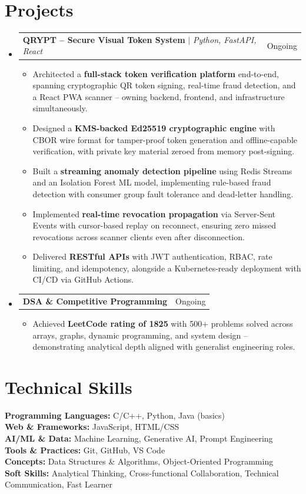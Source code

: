 \documentclass[letterpaper,11pt]{article}
\makeatletter
\newcommand{\resumeItem}[1]{
  \item\small{
    {#1 \vspace{-2pt}}
  }
}
\newcommand{\resumeProjectHeading}[2]{
    \item
    \begin{tabular*}{0.97\textwidth}{l@{\extracolsep{\fill}}r}
      \small#1 & #2 \\
    \end{tabular*}\vspace{-7pt}
}
\newcommand{\resumeSubHeadingListStart}{\begin{itemize}[leftmargin=0.15in, label={}]}
\newcommand{\resumeSubHeadingListEnd}{\end{itemize}}
\newcommand{\resumeItemListStart}{\begin{itemize}}
\newcommand{\resumeItemListEnd}{\end{itemize}\vspace{-5pt}}
\makeatother
\begin{document}
\section{Projects}
  \resumeSubHeadingListStart

    \resumeProjectHeading
      {\textbf{QRYPT -- Secure Visual Token System} $|$ \emph{Python, FastAPI, React} \quad {\scriptsize \textit{(Vibe Coded)}}}{Ongoing}
      \resumeItemListStart
        \resumeItem{Architected a \textbf{full-stack token verification platform} end-to-end, spanning cryptographic QR token signing, real-time fraud detection, and a React PWA scanner -- owning backend, frontend, and infrastructure simultaneously.}
        \resumeItem{Designed a \textbf{KMS-backed Ed25519 cryptographic engine} with CBOR wire format for tamper-proof token generation and offline-capable verification, with private key material zeroed from memory post-signing.}
        \resumeItem{Built a \textbf{streaming anomaly detection pipeline} using Redis Streams and an Isolation Forest ML model, implementing rule-based fraud detection with consumer group fault tolerance and dead-letter handling.}
        \resumeItem{Implemented \textbf{real-time revocation propagation} via Server-Sent Events with cursor-based replay on reconnect, ensuring zero missed revocations across scanner clients even after disconnection.}
        \resumeItem{Delivered \textbf{RESTful APIs} with JWT authentication, RBAC, rate limiting, and idempotency, alongside a Kubernetes-ready deployment with CI/CD via GitHub Actions.}
      \resumeItemListEnd

    \resumeProjectHeading
      {\textbf{DSA \& Competitive Programming}}{Ongoing}
      \resumeItemListStart
        \resumeItem{Achieved \textbf{LeetCode rating of 1825} with 500+ problems solved across arrays, graphs, dynamic programming, and system design -- demonstrating analytical depth aligned with generalist engineering roles.}
      \resumeItemListEnd

  \resumeSubHeadingListEnd

\section{Technical Skills}
 \begin{itemize}[leftmargin=0.15in, label={}]
    \small{\item{
     \textbf{Programming Languages:} C/C++, Python, Java (basics) \\
     \textbf{Web \& Frameworks:} JavaScript, HTML/CSS \\
     \textbf{AI/ML \& Data:} Machine Learning, Generative AI, Prompt Engineering \\
     \textbf{Tools \& Practices:} Git, GitHub, VS Code \\
     \textbf{Concepts:} Data Structures \& Algorithms, Object-Oriented Programming \\
     \textbf{Soft Skills:} Analytical Thinking, Cross-functional Collaboration, Technical Communication, Fast Learner
    }}
 \end{itemize}
\end{document}
